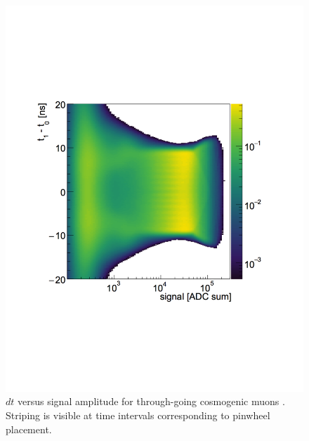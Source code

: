 \begin{figure}
	\begin{minipage}[t]{0.5\linewidth}
		\centering
		\includegraphics[width=0.95\linewidth]{tex/5-analysis-images/dt_S_Hobbes}
		\caption[Muon $dt$ versus signal amplitude]{$dt$ versus signal amplitude for through-going cosmogenic muons \cite{MM:2314}. Striping is visible at time intervals corresponding to pinwheel placement.}
		\label{fig:dtshobbes}
	\end{minipage}
	\begin{minipage}[t]{0.5\linewidth}
		\centering

\end{minipage}
\end{figure}
